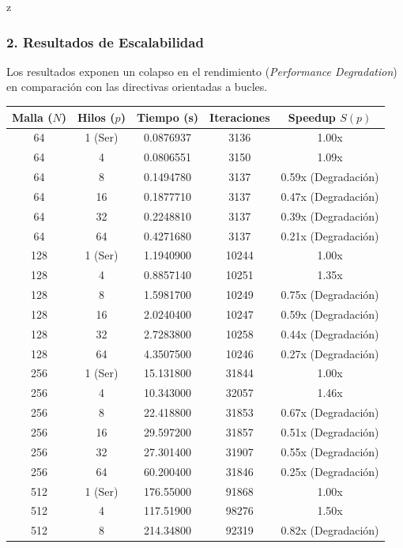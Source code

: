 z\documentclass[11pt,a4paper]{article}
\begin{document}
\subsubsection*{2. Resultados de Escalabilidad}
Los resultados exponen un colapso en el rendimiento (\textit{Performance Degradation}) en comparación con las directivas orientadas a bucles.

\begin{table}[H]
\centering
\renewcommand{\arraystretch}{1.2}
\small
\begin{tabular}{|c|c|c|c|c|}
\hline
\textbf{Malla ($N$)} & \textbf{Hilos ($p$)} & \textbf{Tiempo (s)} & \textbf{Iteraciones} & \textbf{Speedup $S(p)$} \\ \hline
64 & 1 (Ser) & 0.0876937 & 3136 & 1.00x \\ 
64 & 4 & 0.0806551 & 3150 & 1.09x \\ 
64 & 8 & 0.1494780 & 3137 & 0.59x (Degradación) \\ 
64 & 16 & 0.1877710 & 3137 & 0.47x (Degradación) \\ 
64 & 32 & 0.2248810 & 3137 & 0.39x (Degradación) \\ 
64 & 64 & 0.4271680 & 3137 & 0.21x (Degradación) \\ \hline
128 & 1 (Ser) & 1.1940900 & 10244 & 1.00x \\ 
128 & 4 & 0.8857140 & 10251 & 1.35x \\ 
128 & 8 & 1.5981700 & 10249 & 0.75x (Degradación) \\ 
128 & 16 & 2.0240400 & 10247 & 0.59x (Degradación) \\ 
128 & 32 & 2.7283800 & 10258 & 0.44x (Degradación) \\ 
128 & 64 & 4.3507500 & 10246 & 0.27x (Degradación) \\ \hline
256 & 1 (Ser) & 15.131800 & 31844 & 1.00x \\ 
256 & 4 & 10.343000 & 32057 & 1.46x \\ 
256 & 8 & 22.418800 & 31853 & 0.67x (Degradación) \\ 
256 & 16 & 29.597200 & 31857 & 0.51x (Degradación) \\ 
256 & 32 & 27.301400 & 31907 & 0.55x (Degradación) \\ 
256 & 64 & 60.200400 & 31846 & 0.25x (Degradación) \\ \hline
512 & 1 (Ser) & 176.55000 & 91868 & 1.00x \\ 
512 & 4 & 117.51900 & 98276 & 1.50x \\ 
512 & 8 & 214.34800 & 92319 & 0.82x (Degradación) \\ 

\end{tabular}
\end{table}
\end{document}
